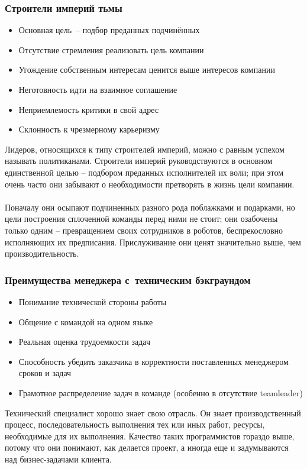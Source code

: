 \documentclass{../industrial-development}
\begin{document}
\begin{frame} \frametitle{Строители империй тьмы }
\begin{itemize}
		\item Основная цель~– подбор преданных подчинённых
		\item Отсутствие стремления реализовать цель компании
		\item Угождение собственным интересам ценится выше интересов компании
		\item Неготовность идти на взаимное соглашение
		\item Неприемлемость критики в свой адрес
		\item Склонность к чрезмерному карьеризму
	\end{itemize}
 
\end{frame}
\lecturenotes
Лидеров, относящихся к типу строителей империй, можно с равным успехом называть политиканами. Строители империй руководствуются в основном единственной целью – подбором преданных исполнителей их воли; при этом очень часто они забывают о необходимости претворять в жизнь цели компании. \\~\\
Поначалу они осыпают подчиненных разного рода поблажками и подарками, но цели построения сплоченной команды перед ними не стоит; они озабочены только одним – превращением своих сотрудников в роботов, беспрекословно исполняющих их предписания. Прислуживание они ценят значительно выше, чем производительность.




\begin{frame} \frametitle{Преимущества менеджера с~техническим бэкграундом}
	 \begin{itemize}
                      \item Понимание технической стороны работы
		\item Общение с командой на одном языке
		\item Реальная оценка трудоемкости задач
		\item Способность убедить заказчика в корректности поставленных менеджером сроков и задач
		\item Грамотное распределение задач в команде (особенно в отсутствие teamleader)
	\end{itemize} 	
\end{frame}
\lecturenotes
Технический специалист хорошо знает свою отрасль. Он знает производственный процесс, последовательность выполнения тех или иных работ, ресурсы, необходимые для их выполнения.
Качество таких программистов гораздо выше, потому что они понимают, как делается проект, а иногда еще и задумываются над бизнес-задачами клиента. 
\end{document}
